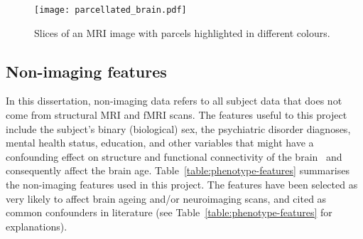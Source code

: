 \begin{figure}[h!]
    \centering
    \texttt{[image: parcellated\_brain.pdf]}
    \caption{Slices of an MRI image with parcels highlighted in different colours.}\label{figure:parcellated-brain}
\end{figure}


\subsection{Non-imaging features}

In this dissertation, non-imaging data refers to all subject data that does not come from structural MRI and fMRI scans. The features useful to this project include the subject's binary (biological) sex, the psychiatric disorder diagnoses, mental health status, education, and other variables that might have a confounding effect on structure and functional connectivity of the brain~\cite{ruigrok2014meta} and consequently affect the brain age. Table~\ref{table:phenotype-features} summarises the non-imaging features used in this project. The features have been selected as very likely to affect brain ageing and/or neuroimaging scans, and cited as common confounders in literature (see Table~\ref{table:phenotype-features} for explanations).

